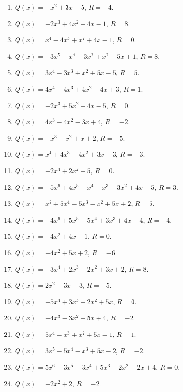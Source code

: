 \documentclass[11pt,oneside]{book}
\begin{document}
\begin{enumerate}[leftmargin=*,label=\textbf{P\arabic*.},itemsep=0.45\baselineskip]
\item $Q(x)=- x^{2} + 3 x + 5$, $R=-4$.
\item $Q(x)=- 2 x^{3} + 4 x^{2} + 4 x - 1$, $R=8$.
\item $Q(x)=x^{4} - 4 x^{3} + x^{2} + 4 x - 1$, $R=0$.
\item $Q(x)=- 3 x^{5} - x^{4} - 3 x^{3} + x^{2} + 5 x + 1$, $R=8$.
\item $Q(x)=3 x^{4} - 3 x^{3} + x^{2} + 5 x - 5$, $R=5$.
\item $Q(x)=4 x^{4} - 4 x^{3} + 4 x^{2} - 4 x + 3$, $R=1$.
\item $Q(x)=- 2 x^{3} + 5 x^{2} - 4 x - 5$, $R=0$.
\item $Q(x)=4 x^{3} - 4 x^{2} - 3 x + 4$, $R=-2$.
\item $Q(x)=- x^{3} - x^{2} + x + 2$, $R=-5$.
\item $Q(x)=x^{4} + 4 x^{3} - 4 x^{2} + 3 x - 3$, $R=-3$.
\item $Q(x)=- 2 x^{4} + 2 x^{2} + 5$, $R=0$.
\item $Q(x)=- 5 x^{6} + 4 x^{5} + x^{4} - x^{3} + 3 x^{2} + 4 x - 5$, $R=3$.
\item $Q(x)=x^{5} + 5 x^{4} - 5 x^{3} - x^{2} + 5 x + 2$, $R=5$.
\item $Q(x)=- 4 x^{6} + 5 x^{5} + 5 x^{4} + 3 x^{3} + 4 x - 4$, $R=-4$.
\item $Q(x)=- 4 x^{2} + 4 x - 1$, $R=0$.
\item $Q(x)=- 4 x^{2} + 5 x + 2$, $R=-6$.
\item $Q(x)=- 3 x^{4} + 2 x^{3} - 2 x^{2} + 3 x + 2$, $R=8$.
\item $Q(x)=2 x^{2} - 3 x + 3$, $R=-5$.
\item $Q(x)=- 5 x^{4} + 3 x^{3} - 2 x^{2} + 5 x$, $R=0$.
\item $Q(x)=- 4 x^{3} - 3 x^{2} + 5 x + 4$, $R=-2$.
\item $Q(x)=5 x^{4} - x^{3} + x^{2} + 5 x - 1$, $R=1$.
\item $Q(x)=3 x^{5} - 5 x^{4} - x^{3} + 5 x - 2$, $R=-2$.
\item $Q(x)=5 x^{6} - 3 x^{5} - 3 x^{4} + 5 x^{3} - 2 x^{2} - 2 x + 4$, $R=0$.
\item $Q(x)=- 2 x^{2} + 2$, $R=-2$.
\end{enumerate}
\end{document}
